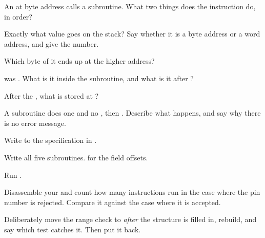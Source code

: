 \label{c2:ex:call}
\begin{parts}
  \item An  at byte address  calls a subroutine. What two things does the
    instruction do, in order?
  \item Exactly what value goes on the stack? Say whether it is a byte address or a word address,
    and give the number.
  \item Which byte of it ends up at the higher address?
  \item {} was . What is it inside the subroutine, and what is it after
    ?
  \item After the , what is stored at ?
  \item A subroutine does one  and no , then . Describe what
    happens, and say why there is no error message.
\end{parts}

\label{c2:ex:driver}
Write  to the specification in .
\begin{parts}
  \item Write all five subroutines.  for the field offsets.
  \item Run .
  \item Disassemble your  and count how many instructions run in the case where the
    pin number is rejected. Compare it against the case where it is accepted.
  \item Deliberately move the range check to \emph{after} the structure is filled in, rebuild, and
    say which test catches it. Then put it back.
\end{parts}

